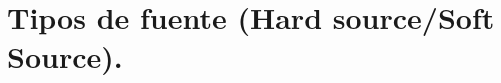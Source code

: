\documentclass[12pt, oneside]{book}
\begin{document}
\chapter{Tipos de fuente (Hard source/Soft Source).}






























\end{document}
